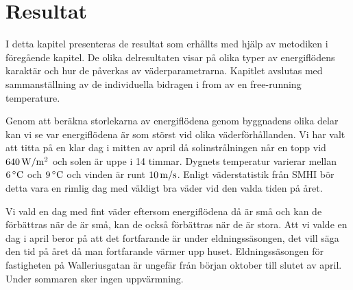 \chapter{Resultat}

I detta kapitel presenteras de resultat som erhållts med hjälp av metodiken i föregående kapitel. De olika delresultaten visar på olika typer av energiflödens karaktär och hur de påverkas av väderparametrarna. Kapitlet avslutas med sammanställning av de individuella bidragen i from av en free-running temperature.

Genom att beräkna storlekarna av energiflödena genom byggnadens olika delar kan vi se var energiflödena är som störst vid olika väderförhållanden. Vi har valt att titta på en klar dag i mitten av april då solinstrålningen når en topp vid $\unit[640]{W/m^2}$ och solen är uppe i 14 timmar. Dygnets temperatur varierar mellan $\unit[6]{^\circ C}$ och $\unit[9]{^\circ C}$ och vinden är runt $\unit[10]{m/s}$. Enligt väderstatistik från SMHI\cite{SMHIdata} bör detta vara en rimlig dag med väldigt bra väder vid den valda tiden på året.

Vi vald en dag med fint väder eftersom energiflödena då är små och kan de förbättras när de är små, kan de också förbättras när de är stora. Att vi valde en dag i april beror på att det fortfarande är under eldningssäsongen, det vill säga den tid på året då man fortfarande värmer upp huset. Eldningssäsongen för fastigheten på Walleriusgatan är ungefär från början oktober till slutet av april. Under sommaren sker ingen uppvärmning.










% 


